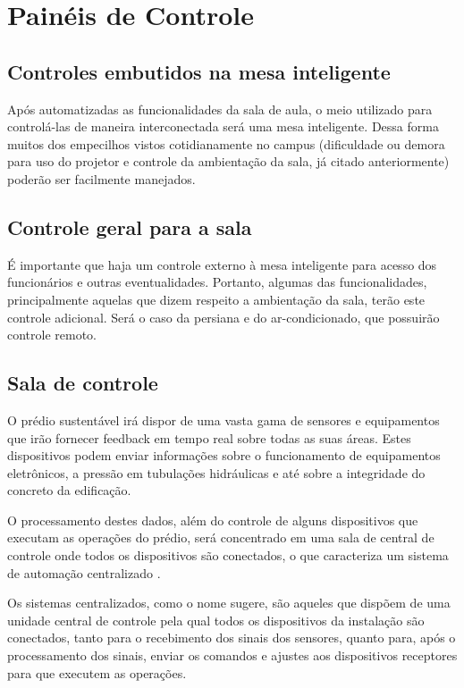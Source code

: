 \section{Painéis de Controle}
\subsection{Controles embutidos na mesa inteligente}
Após automatizadas as funcionalidades da sala de aula, o meio utilizado para controlá-las de maneira interconectada será uma mesa inteligente. Dessa forma muitos dos empecilhos vistos cotidianamente no campus (dificuldade ou demora para uso do projetor e controle da ambientação da sala, já citado anteriormente) poderão ser facilmente manejados.

\subsection{Controle geral para a sala}
É importante que haja um controle externo à mesa inteligente para acesso dos funcionários e outras eventualidades. Portanto, algumas das funcionalidades, principalmente aquelas que dizem respeito a ambientação da sala, terão este controle adicional. Será o caso da persiana e do ar-condicionado, que possuirão controle remoto.

\subsection{Sala de controle}
O prédio sustentável irá dispor de uma vasta gama de sensores e equipamentos que irão fornecer feedback em tempo real sobre todas as suas áreas. Estes dispositivos podem enviar informações sobre o funcionamento de equipamentos eletrônicos, a pressão em tubulações hidráulicas e até sobre a integridade do concreto da edificação.

O processamento destes dados, além do controle de alguns dispositivos que executam as operações do prédio, será concentrado em uma sala de central de controle onde todos os dispositivos são conectados, o que caracteriza um sistema de automação centralizado \cite{dias2004}.

Os sistemas centralizados, como o nome sugere, são aqueles que dispõem de uma unidade central de controle pela qual todos os dispositivos da instalação são conectados, tanto para o recebimento dos sinais dos sensores, quanto para, após o processamento dos sinais, enviar os comandos e ajustes aos dispositivos receptores para que executem as operações.

